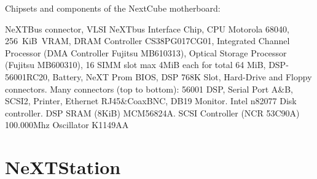 \vspace{50 mm}
\par
Chipsets and components of the NextCube motherboard:\\
\par 
{} NeXTBus connector,
 VLSI NeXTbus Interface Chip,
 CPU Motorola 68040,
 256~KiB~VRAM,
 DRAM Controller CS38PG017CG01,
 Integrated Channel Processor (DMA Controller Fujitsu MB610313),
 Optical Storage Processor (Fujitsu MB600310),
 16 SIMM slot max 4MiB each for total 64 MiB,
 DSP-56001RC20,
 Battery,
 NeXT Prom BIOS,
 DSP 768K Slot,
 Hard-Drive and Floppy connectors.
 Many connectors (top to bottom): 56001 DSP, Serial Port A\&B, SCSI2, Printer, Ethernet RJ45\&CoaxBNC, DB19 Monitor. 
 Intel n82077 Disk controller.
 DSP SRAM (8KiB) MCM56824A.
 SCSI Controller (NCR 53C90A)
 100.000Mhz Oscillator K1149AA






\section{NeXTStation}

